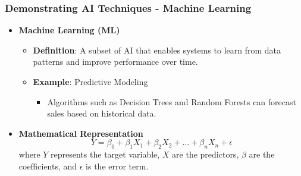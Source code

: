 \documentclass[aspectratio=169]{beamer}
\begin{document}
\begin{frame}[fragile]
    \frametitle{Demonstrating AI Techniques - Machine Learning}
    \begin{itemize}
        \item \textbf{Machine Learning (ML)}
            \begin{itemize}
                \item \textbf{Definition}: A subset of AI that enables systems to learn from data patterns and improve performance over time.
                \item \textbf{Example}: Predictive Modeling
                \begin{itemize}
                    \item Algorithms such as Decision Trees and Random Forests can forecast sales based on historical data.
                \end{itemize}
            \end{itemize}
        \item \textbf{Mathematical Representation}
            \begin{equation}
            Y = \beta_0 + \beta_1X_1 + \beta_2X_2 + ... + \beta_nX_n + \epsilon
            \end{equation}
            where $Y$ represents the target variable, $X$ are the predictors, $\beta$ are the coefficients, and $\epsilon$ is the error term.
    \end{itemize}
\end{frame}
\end{document}
